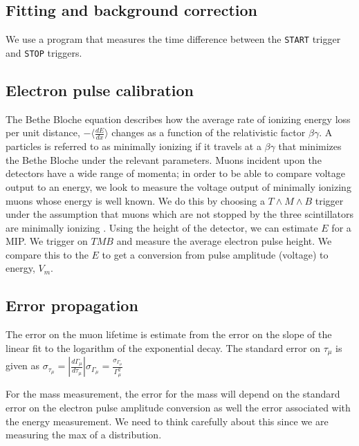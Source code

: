 \documentclass[aps,prb,twocolumn,superscriptaddress,floatfix,longbibliography,citeautoscript]{revtex4-2}
\begin{document}
\subsection{Fitting and background correction}

 We use a  program that measures the time difference between the \texttt{START} trigger and \texttt{STOP} triggers. 

\subsection{\label{sec:calibration}Electron pulse calibration}
The Bethe Bloche equation describes how the average rate of ionizing energy loss per unit distance, $-\langle \frac{dE}{dx}\rangle$ changes as a function of the relativistic factor $\beta\gamma$. A particles is referred to as minimally ionizing if it travels at a $\beta \gamma$ that minimizes the Bethe Bloche under the relevant parameters. Muons incident upon the detectors have a wide range of momenta; in order to be able to compare voltage output to an energy, we look to measure the voltage output of minimally ionizing muons whose energy is well known. We do this by choosing a $T \wedge M \wedge B$ trigger under the assumption that muons which are not stopped by the three scintillators are minimally ionizing . Using the height of the detector, we can estimate $E$ for a MIP. We trigger on $TMB$ and measure the average electron pulse height. We compare this to the $E$ to get a conversion from pulse amplitude (voltage) to energy, $V_m$.
\subsection{Error propagation}
The error on the muon lifetime is estimate from the error on the slope of the linear fit to the logarithm of the exponential decay. The standard error on $\tau_\mu$ is given as $\sigma_{\tau_\mu} = \left|\frac{d\Gamma_\mu}{d\tau_\mu}\right|\sigma_{\Gamma_\mu} = \frac{\sigma_{\Gamma_\mu}}{\Gamma_\mu^2}$
 
 
For the mass measurement, the error for the mass will depend on the standard error on the electron pulse amplitude conversion as well the error associated with the energy measurement. We need to think carefully about this since we are measuring the max of a distribution.
\end{document}
